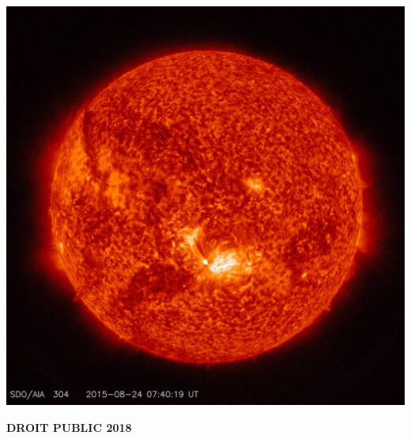 
\begin{titlepage}
	\parindent=0pt
 
\addtolength{\wpXoffset}{-4.5cm}

	\begin{center}
		\includegraphics[scale=0.5]{images/sol}%
	\end{center}
	
	\hrulefill
	\begin{center}\bfseries\Huge
		\color{black}
		{DROIT PUBLIC 2018 } 
	\end{center}
	\hrulefill
	
	\vspace*{1cm}
	\begin{center}\bfseries\Large
			\color{white}
			{}
		
	\end{center}
	


\end{titlepage}

